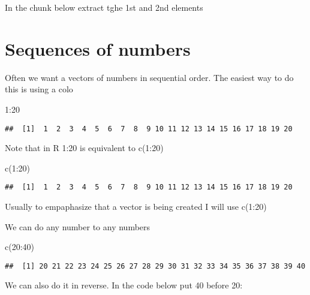\documentclass[
]{book}
\newenvironment{Shaded}{\begin{snugshade}}{\end{snugshade}}
\newcommand{\DecValTok}[1]{\textcolor[rgb]{0.00,0.00,0.81}{#1}}
\newcommand{\FunctionTok}[1]{\textcolor[rgb]{0.00,0.00,0.00}{#1}}
\newcommand{\NormalTok}[1]{#1}
\newcommand{\SpecialCharTok}[1]{\textcolor[rgb]{0.00,0.00,0.00}{#1}}
\begin{document}
In the chunk below extract tghe 1st and 2nd elements

\hypertarget{sequences-of-numbers}{%
\section{Sequences of numbers}\label{sequences-of-numbers}}

Often we want a vectors of numbers in sequential order. The easiest way to do this is using a colo

\begin{Shaded}
\begin{Highlighting}[]
\DecValTok{1}\SpecialCharTok{:}\DecValTok{20}
\end{Highlighting}
\end{Shaded}

\begin{verbatim}
##  [1]  1  2  3  4  5  6  7  8  9 10 11 12 13 14 15 16 17 18 19 20
\end{verbatim}

Note that in R 1:20 is equivalent to c(1:20)

\begin{Shaded}
\begin{Highlighting}[]
\FunctionTok{c}\NormalTok{(}\DecValTok{1}\SpecialCharTok{:}\DecValTok{20}\NormalTok{)}
\end{Highlighting}
\end{Shaded}

\begin{verbatim}
##  [1]  1  2  3  4  5  6  7  8  9 10 11 12 13 14 15 16 17 18 19 20
\end{verbatim}

Usually to empaphasize that a vector is being created I will use c(1:20)

We can do any number to any numbers

\begin{Shaded}
\begin{Highlighting}[]
\FunctionTok{c}\NormalTok{(}\DecValTok{20}\SpecialCharTok{:}\DecValTok{40}\NormalTok{)}
\end{Highlighting}
\end{Shaded}

\begin{verbatim}
##  [1] 20 21 22 23 24 25 26 27 28 29 30 31 32 33 34 35 36 37 38 39 40
\end{verbatim}

We can also do it in reverse. In the code below put 40 before 20:
\end{document}

